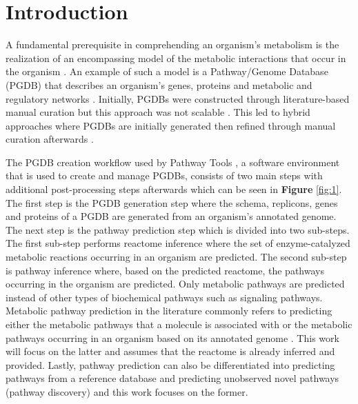 \documentclass[sn-mathphys,Numbered]{sn-jnl}%
\theoremstyle{thmstyleone}%
\theoremstyle{thmstyletwo}%
\theoremstyle{thmstylethree}%
\begin{document}
\section{Introduction}\label{sec1}
\linenumbers
A fundamental prerequisite in comprehending an organism's metabolism is the realization of an encompassing model of the metabolic interactions that occur in the organism \cite{daleMachineLearningMethods2010}.
An example of such a model is a Pathway/Genome Database (PGDB) that describes an organism's genes, proteins and metabolic and regulatory networks \cite{karpPathwayToolsVersion2015a}.
Initially, PGDBs were constructed through literature-based manual curation but this approach was not scalable \cite{karpEcoCycDatabase2002}.
This led to hybrid approaches where PGDBs are initially generated then refined through manual curation afterwards \cite{romeroComputationalPredictionHuman2004}.

The PGDB creation workflow used by Pathway Tools \cite{karpPathwayToolsVersion2015a}, a software environment that is used to create and manage PGDBs, consists of two main steps with additional post-processing steps afterwards which can be seen in \textbf{Figure} \ref{fig:1}.
The first step is the PGDB generation step where the schema, replicons, genes and proteins of a PGDB are generated from an organism's annotated genome. 
The next step is the pathway prediction step which is divided into two sub-steps. 
The first sub-step performs reactome inference where the set of enzyme-catalyzed metabolic reactions occurring in an organism are predicted. 
The second sub-step is pathway inference where, based on the predicted reactome, the pathways occurring in the organism are predicted.
Only metabolic pathways are predicted instead of other types of biochemical pathways such as signaling pathways.
Metabolic pathway prediction in the literature commonly refers to predicting either the metabolic pathways that a molecule is associated with \cite{moriyaPathPredEnzymecatalyzedMetabolic2010}\cite{baranwalDeepLearningArchitecture2020}\cite{jiaSimilarityBasedMachineLearning2020a} or the metabolic pathways occurring in an organism based on its annotated genome \cite{daleMachineLearningMethods2010}\cite{karpPathwayToolsPathway2011}\cite{mabasherLeveragingHeterogeneousNetwork2021}.
This work will focus on the latter and assumes that the reactome is already inferred and provided.
Lastly, pathway prediction can also be differentiated into predicting pathways from a reference database and predicting unobserved novel pathways (pathway discovery) \cite{daleMachineLearningMethods2010} and this work focuses on the former.
\end{document}
